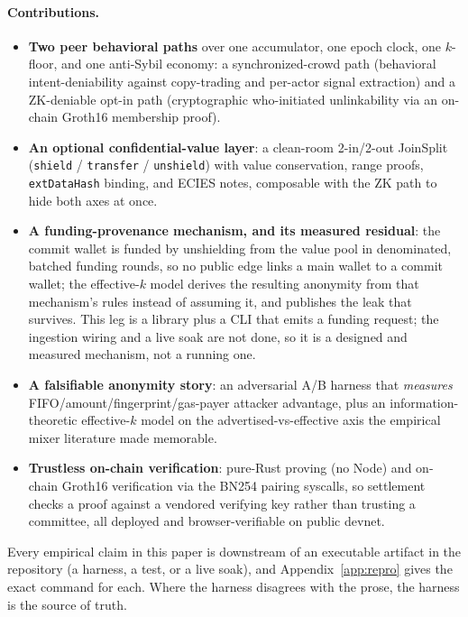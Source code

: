 \documentclass[10pt]{article}
\newcommand{\code}[1]{\texttt{#1}}
\begin{document}
\paragraph{Contributions.}
\begin{itemize}[leftmargin=1.4em,itemsep=0.15em]
  \item \textbf{Two peer behavioral paths} over one accumulator, one epoch
        clock, one $k$-floor, and one anti-Sybil economy: a synchronized-crowd
        path (behavioral intent-deniability against copy-trading and per-actor
        signal extraction) and a ZK-deniable opt-in path (cryptographic
        who-initiated unlinkability via an on-chain Groth16 membership proof).
  \item \textbf{An optional confidential-value layer}: a clean-room 2-in/2-out
        JoinSplit (\code{shield} / \code{transfer} / \code{unshield}) with value
        conservation, range proofs, \code{extDataHash} binding, and ECIES notes,
        composable with the ZK path to hide both axes at once.
  \item \textbf{A funding-provenance mechanism, and its measured residual}: the
        commit wallet is funded by unshielding from the value pool in
        denominated, batched funding rounds, so no public edge links a main
        wallet to a commit wallet; the effective-$k$ model derives the resulting
        anonymity from that mechanism's rules instead of assuming it, and
        publishes the leak that survives. This leg is a library plus a CLI that
        emits a funding request; the ingestion wiring and a live soak are not
        done, so it is a designed and measured mechanism, not a running one.
  \item \textbf{A falsifiable anonymity story}: an adversarial A/B harness that
        \emph{measures} FIFO/amount/fingerprint/gas-payer attacker advantage,
        plus an information-theoretic effective-$k$ model on the
        advertised-vs-effective axis the empirical mixer literature made
        memorable.
  \item \textbf{Trustless on-chain verification}: pure-Rust proving (no Node) and
        on-chain Groth16 verification via the BN254 pairing syscalls, so
        settlement checks a proof against a vendored verifying key rather than
        trusting a committee, all deployed and browser-verifiable on public
        devnet.
\end{itemize}

Every empirical claim in this paper is downstream of an executable artifact in
the repository (a harness, a test, or a live soak), and Appendix~\ref{app:repro}
gives the exact command for each. Where the harness disagrees with the prose, the
harness is the source of truth.
\end{document}
